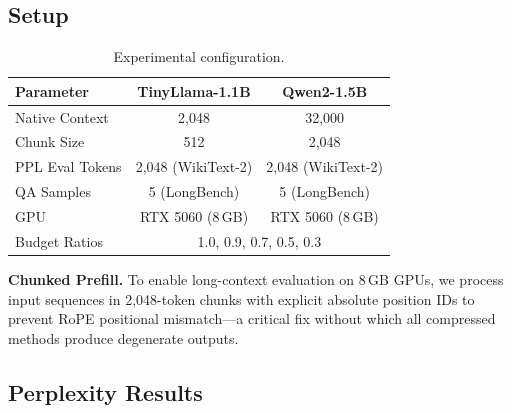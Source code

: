 \documentclass{article}
\begin{document}
\subsection{Setup}

\begin{table}[h]
\centering
\caption{Experimental configuration.}
\begin{tabular}{lcc}
\toprule
Parameter & TinyLlama-1.1B & Qwen2-1.5B \\
\midrule
Native Context & 2,048 & 32,000 \\
Chunk Size & 512 & 2,048 \\
PPL Eval Tokens & 2,048 (WikiText-2) & 2,048 (WikiText-2) \\
QA Samples & 5 (LongBench) & 5 (LongBench) \\
GPU & RTX 5060 (8\,GB) & RTX 5060 (8\,GB) \\
Budget Ratios & \multicolumn{2}{c}{1.0, 0.9, 0.7, 0.5, 0.3} \\
\bottomrule
\end{tabular}
\end{table}

\textbf{Chunked Prefill.} To enable long-context evaluation on 8\,GB GPUs, we process input sequences in 2,048-token chunks with explicit absolute position IDs to prevent RoPE positional mismatch---a critical fix without which all compressed methods produce degenerate outputs.

\subsection{Perplexity Results}
\end{document}
